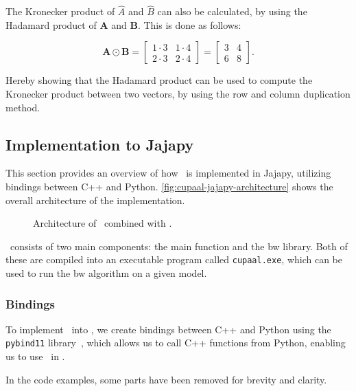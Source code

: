 The Kronecker product of $\hat{A}$ and $\hat{B}$ can also be calculated, by using the Hadamard product of $\mathbf{A}$ and $\mathbf{B}$.
This is done as follows:


\begin{equation}
    \mathbf{A} \odot \mathbf{B} = \begin{bmatrix}
        1 \cdot 3 & 1 \cdot 4 \\
        2 \cdot 3 & 2 \cdot 4
    \end{bmatrix} = \begin{bmatrix}
        3 & 4 \\
        6 & 8
    \end{bmatrix}.
\end{equation}


Hereby showing that the Hadamard product can be used to compute the Kronecker product between two vectors, by using the row and column duplication method.

\subsection{Implementation to Jajapy}\label{subsec:implementation-to-jajapy}
This section provides an overview of how \Cupaal\ is implemented in Jajapy, utilizing bindings between C++ and Python. \autoref{fig:cupaal-jajapy-architecture} shows the overall architecture of the implementation.


\begin{figure}
    \centering
    
    \caption{Architecture of \Cupaal\ combined with \Jajapy.}
    \label{fig:cupaal-jajapy-architecture}
\end{figure}

\Cupaal\ consists of two main components: the main function and the \gls{bw} library. Both of these are compiled into an executable program called \texttt{cupaal.exe}, which can be used to run the \gls{bw} algorithm on a given model.

\subsubsection{Bindings}\label{subsubsec:bindings}
To implement \Cupaal\ into \Jajapy, we create bindings between C++ and Python using the \texttt{pybind11} library~\cite{pybind11github}, which allows us to call C++ functions from Python, enabling us to use \Cupaal\ in \Jajapy.

In the code examples, some parts have been removed for brevity and clarity.


